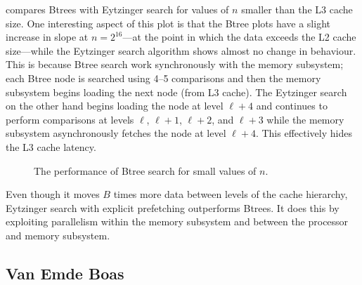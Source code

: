 \documentclass{patmorin}
\begin{document}
 compares Btrees with Eytzinger search for values
of $n$ smaller than the L3 cache size.  One interesting aspect of
this plot is that the Btree plots have a slight increase in slope
at $n=2^{16}$---at the point in which the data exceeds the L2 cache
size---while the Eytzinger search algorithm shows almost no change in
behaviour.  This is because Btree search work synchronously with the memory
subsystem; each Btree node is searched using 4--5 comparisons and
then the memory subsystem begins loading the next node (from L3 cache).
The Eytzinger search on the other hand begins loading the node at level
$\ell+4$ and continues to perform comparisons at levels $\ell$, $\ell+1$,
$\ell+2$, and $\ell+3$ while the memory subsystem asynchronously fetches
the node at level $\ell+4$. This effectively hides the L3 cache latency.

\begin{figure}
   \caption{The performance of Btree search for small values of $n$.}
\end{figure}

\begin{lesson}
  Even though it moves $B$ times more data between levels of the cache
  hierarchy, Eytzinger search with explicit prefetching outperforms
  Btrees.  It does this by exploiting parallelism within the memory
  subsystem and between the processor and memory subsystem.
\end{lesson}

%
%
%
%
%
%
%
\subsection{Van Emde Boas}
\end{document}
